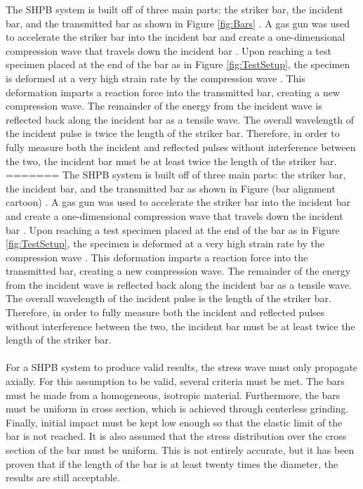 \documentclass[12pt]{article}
\begin{document}
The SHPB system is built off of three main parts: the striker bar, the incident bar, and the transmitted bar as shown in Figure \ref{fig:Bars} \cite{Frew2002} \cite{Follansbee} \cite{Frew}. A gas gun was used to accelerate the striker bar into the incident bar and create a one-dimensional compression wave that travels down the incident bar \cite{Frew}. Upon reaching a test specimen placed at the end of the bar as in Figure \ref{fig:TestSetup}, the specimen is deformed at a very high strain rate by the compression wave \cite{Dai}. This deformation imparts a reaction force into the transmitted bar, creating a new compression wave. The remainder of the energy from the incident wave is reflected back along the incident bar as a tensile wave. The overall wavelength of the incident pulse is twice the length of the  striker bar. Therefore, in order to fully measure both the incident and reflected pulses without interference between the two, the incident bar must be at least twice the length of the striker bar.
=======
The SHPB system is built off of three main parts: the striker bar, the incident bar, and the transmitted bar as shown in Figure (bar alignment cartoon) \cite{Frew2002} \cite{Follansbee} \cite{Frew}. A gas gun was used to accelerate the striker bar into the incident bar and create a one-dimensional compression wave that travels down the incident bar \cite{Frew}. Upon reaching a test specimen placed at the end of the bar as in Figure \ref{fig:TestSetup}, the specimen is deformed at a very high strain rate by the compression wave \cite{Dai}. This deformation imparts a reaction force into the transmitted bar, creating a new compression wave. The remainder of the energy from the incident wave is reflected back along the incident bar as a tensile wave. The overall wavelength of the incident pulse is the length of the striker bar. Therefore, in order to fully measure both the incident and reflected pulses without interference between the two, the incident bar must be at least twice the length of the striker bar.
\\ \\
For a SHPB system to produce valid results, the stress wave must only propagate axially. For this assumption to be valid, several criteria must be met. The bars must be made from a homogeneous, isotropic material. Furthermore, the bars must be uniform in cross section, which is achieved through centerless grinding. Finally, initial impact must be kept low enough so that the elastic limit of the bar is not reached. It is also assumed that the stress distribution over the cross section of the bar must be uniform. This is not entirely accurate, but it has been proven that if the length of the bar is at least twenty times the diameter, the results are still acceptable. 
\end{document}
